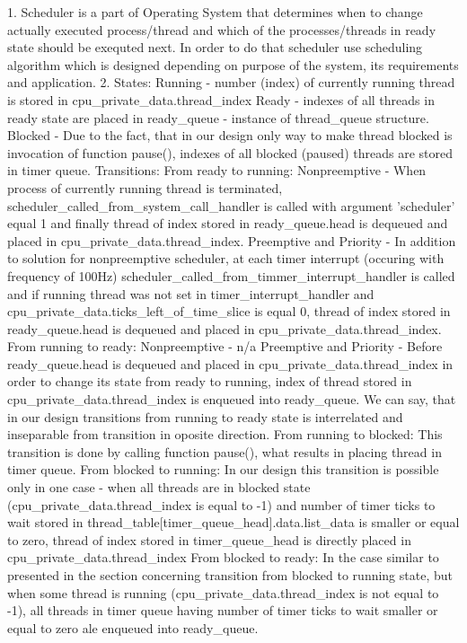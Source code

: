 1. Scheduler is a part of Operating System that determines when to change actually executed process/thread and which of the processes/threads in ready state should be exequted next. In order to do that scheduler use scheduling algorithm which is designed depending on purpose of the system, its requirements and application.
2.
States:
Running - number (index) of currently running thread is stored in cpu_private_data.thread_index
Ready - indexes of all threads in ready state are placed in ready_queue - instance of thread_queue structure.
Blocked - Due to the fact, that in our design only way to make thread blocked is invocation of function pause(), indexes of all blocked (paused) threads are stored in timer queue.
Transitions:
From ready to running:
Nonpreemptive - When process of currently running thread is terminated, scheduler_called_from_system_call_handler is called with argument 'scheduler' equal 1 and finally thread of index stored in ready_queue.head is dequeued and placed in cpu_private_data.thread_index.
Preemptive and Priority - In addition to solution for nonpreemptive scheduler, at each timer interrupt (occuring with frequency of 100Hz) scheduler_called_from_timmer_interrupt_handler is called and if running thread was not set in timer_interrupt_handler and cpu_private_data.ticks_left_of_time_slice is equal 0, thread of index stored in ready_queue.head is dequeued and placed in cpu_private_data.thread_index.
From running to ready:
Nonpreemptive - n/a
Preemptive and Priority - Before ready_queue.head is dequeued and placed in cpu_private_data.thread_index in order to change its state from ready to running, index of thread stored in cpu_private_data.thread_index is enqueued into ready_queue. We can say, that in our design transitions from running to ready state is interrelated and inseparable from transition in oposite direction.
From running to blocked:
This transition is done by calling function pause(), what results in placing thread in timer queue.
From blocked to running:
In our design this transition is possible only in one case - when all threads are in blocked state (cpu_private_data.thread_index is equal to -1) and number of timer ticks to wait stored in thread_table[timer_queue_head].data.list_data is smaller or equal to zero, thread of index stored in timer_queue_head is directly placed in cpu_private_data.thread_index
From blocked to ready:
In the case similar to presented in the section concerning transition from blocked to running state, but when some thread is running (cpu_private_data.thread_index is not equal to -1), all threads in timer queue having number of timer ticks to wait smaller or equal to zero ale enqueued into ready_queue.
